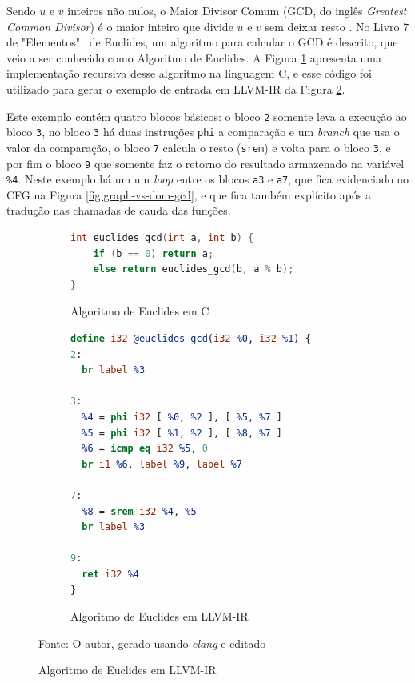 Sendo $u$ e $v$ inteiros não nulos, o Maior Divisor Comum (GCD, do inglês \emph{Greatest Common Divisor}) é o maior inteiro que divide $u$ e $v$ sem deixar resto \cite{knuth2014art}. No Livro 7 de "Elementos" \ de Euclides, um algoritmo para calcular o GCD é descrito, que veio a ser conhecido como Algoritmo de Euclides. A Figura \ref{fig:euclides-cpp} apresenta uma implementação recursiva desse algoritmo na linguagem C, e esse código foi utilizado para gerar o exemplo de entrada em LLVM-IR da Figura \ref{fig:euclides-llvm}.

Este exemplo contém quatro blocos básicos: o bloco \verb|2| somente leva a execução ao bloco \verb|3|, no bloco \verb|3| há duas instruções \verb|phi| a comparação e um \emph{branch} que usa o valor da comparação, o bloco \verb|7| calcula o resto (\verb|srem|) e volta para o bloco \verb|3|, e por fim o bloco \verb|9| que somente faz o retorno do resultado armazenado na variável \verb|%4|. Neste exemplo há um um \emph{loop} entre os blocos \verb|a3| e \verb|a7|, que fica evidenciado no CFG na Figura \ref{fig:graph-vs-dom-gcd}, e que fica também explícito após a tradução nas chamadas de cauda das funções.

\begin{figure}[H]
    \centering
    \begin{subfigure}[b]{\textwidth}
        \centering
        \lstset{xleftmargin=.22\textwidth}
        \begin{lstlisting}[language=c,style=nasm]
int euclides_gcd(int a, int b) {
    if (b == 0) return a;
    else return euclides_gcd(b, a % b);
}
        \end{lstlisting}
        \caption{Algoritmo de Euclides em C}
        \label{fig:euclides-cpp}
    \end{subfigure}

    \vspace{1em} %

    \begin{subfigure}[b]{\textwidth}
        \begin{center}
        \lstset{xleftmargin=.20\textwidth}
        \begin{lstlisting}[language=llvm,style=nasm]
define i32 @euclides_gcd(i32 %0, i32 %1) {
2:
  br label %3

3:
  %4 = phi i32 [ %0, %2 ], [ %5, %7 ]
  %5 = phi i32 [ %1, %2 ], [ %8, %7 ]
  %6 = icmp eq i32 %5, 0
  br i1 %6, label %9, label %7

7:
  %8 = srem i32 %4, %5
  br label %3

9:
  ret i32 %4
}
        \end{lstlisting}
        \caption{Algoritmo de Euclides em LLVM-IR}
        \label{fig:euclides-llvm}
        \end{center}
    \end{subfigure}

    \vspace{.5em} %
    
    \caption{Algoritmo de Euclides em LLVM-IR}
    \label{fig:euclides-entrada}
    \small{Fonte: O autor, gerado usando \emph{clang} e editado}
\end{figure}


